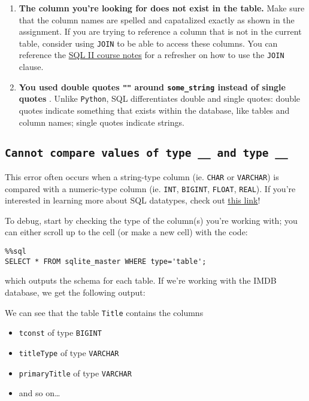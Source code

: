 \documentclass[
  letterpaper,
  DIV=11,
  numbers=noendperiod]{scrreprt}
\providecommand{\tightlist}{%
  \setlength{\itemsep}{0pt}\setlength{\parskip}{0pt}}\usepackage{longtable,booktabs,array}
\begin{document}
\begin{enumerate}
\def\labelenumi{\arabic{enumi}.}
\tightlist
\item
  \textbf{The column you're looking for does not exist in the table.}
  Make sure that the column names are spelled and capatalized exactly as
  shown in the assignment. If you are trying to reference a column that
  is not in the current table, consider using \texttt{JOIN} to be able
  to access these columns. You can reference the
  \href{https://ds100.org/course-notes/sql_II/sql_II.html\#joining-tables}{SQL
  II course notes} for a refresher on how to use the \texttt{JOIN}
  clause.
\item
  \textbf{You used double quotes \texttt{""} around
  \texttt{some\_string} instead of single quotes
  \texttt{\textquotesingle{}\textquotesingle{}}}. Unlike
  \texttt{Python}, SQL differentiates double and single quotes: double
  quotes indicate something that exists within the database, like tables
  and column names; single quotes indicate strings.
\end{enumerate}

\subsection{\texorpdfstring{\texttt{Cannot\ compare\ values\ of\ type\ \_\_\ and\ type\ \_\_}}{Cannot compare values of type \_\_ and type \_\_}}\label{cannot-compare-values-of-type-__-and-type-__}

This error often occurs when a string-type column (ie. \texttt{CHAR} or
\texttt{VARCHAR}) is compared with a numeric-type column (ie.
\texttt{INT}, \texttt{BIGINT}, \texttt{FLOAT}, \texttt{REAL}). If you're
interested in learning more about SQL datatypes, check out
\href{https://www.w3schools.com/sql/sql_datatypes.asp}{this link}!

To debug, start by checking the type of the column(s) you're working
with; you can either scroll up to the cell (or make a new cell) with the
code:

\begin{verbatim}
%%sql
SELECT * FROM sqlite_master WHERE type='table';
\end{verbatim}

which outputs the schema for each table. If we're working with the IMDB
database, we get the following output:

We can see that the table \texttt{Title} contains the columns

\begin{itemize}
\tightlist
\item
  \texttt{tconst} of type \texttt{BIGINT}
\item
  \texttt{titleType} of type \texttt{VARCHAR}
\item
  \texttt{primaryTitle} of type \texttt{VARCHAR}
\item
  and so on\ldots{}
\end{itemize}
\end{document}
